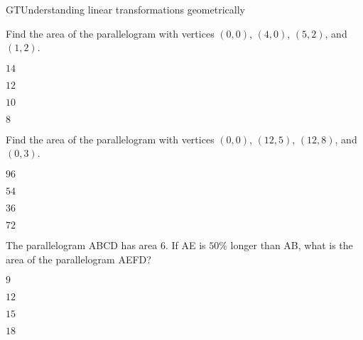 \documentclass{article}
\begin{document}
\begin{module}{GT}{Understanding linear transformations geometrically}
\begin{readinessAssuranceTest}
\setcounter{enumi}{40}


\item Find the area of the parallelogram with vertices $(0,0)$, $(4,0)$, $(5,2)$, and $(1,2)$.
\begin{multicols}{2}
\begin{readinessAssuranceTestChoices}
\item $14$
\item $12$
\item $10$
\item $8$ %
\end{readinessAssuranceTestChoices}


\end{multicols}

\item Find the area of the parallelogram with vertices $(0,0)$, $(12,5)$, $(12,8)$, and $(0,3)$.
\begin{multicols}{2}
\begin{readinessAssuranceTestChoices}
\item $96$
\item $54$
\item $36$ %
\item $72$
\end{readinessAssuranceTestChoices}


\end{multicols}

\item The parallelogram ABCD has area $6$.  If AE is $50\%$ longer than AB, what is the area of the parallelogram AEFD?
\begin{multicols}{2}
\begin{readinessAssuranceTestChoices}
\item $9$  %
\item $12$
\item $15$
\item $18$
\end{readinessAssuranceTestChoices}


\end{multicols}
\end{readinessAssuranceTest}
\end{module}
\end{document}
